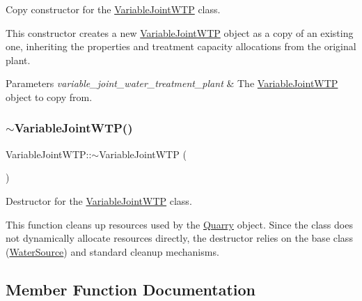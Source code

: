Copy constructor for the {\ttfamily \mbox{\hyperlink{classVariableJointWTP}{Variable\+Joint\+W\+TP}}} class. 

This constructor creates a new {\ttfamily \mbox{\hyperlink{classVariableJointWTP}{Variable\+Joint\+W\+TP}}} object as a copy of an existing one, inheriting the properties and treatment capacity allocations from the original plant.


\begin{DoxyParams}{Parameters}
{\em variable\+\_\+joint\+\_\+water\+\_\+treatment\+\_\+plant} & The {\ttfamily \mbox{\hyperlink{classVariableJointWTP}{Variable\+Joint\+W\+TP}}} object to copy from. \\
\hline
\end{DoxyParams}
\mbox{\label{classVariableJointWTP_aaa9eccc2b254ebe82769cc90bed5b893}} 
\subsubsection{\texorpdfstring{$\sim$\+Variable\+Joint\+W\+T\+P()}{~VariableJointWTP()}}
{\footnotesize\ttfamily Variable\+Joint\+W\+T\+P\+::$\sim$\+Variable\+Joint\+W\+TP (\begin{DoxyParamCaption}{ }\end{DoxyParamCaption})\hspace{0.3cm}{\ttfamily [override]}}



Destructor for the {\ttfamily \mbox{\hyperlink{classVariableJointWTP}{Variable\+Joint\+W\+TP}}} class. 

This function cleans up resources used by the \mbox{\hyperlink{classQuarry}{Quarry}} object. Since the class does not dynamically allocate resources directly, the destructor relies on the base class ({\ttfamily \mbox{\hyperlink{classWaterSource}{Water\+Source}}}) and standard cleanup mechanisms. 

\subsection{Member Function Documentation}
\mbox{\label{classVariableJointWTP_ab20f14dccd7079f546984d7bf1c00a71}} 
